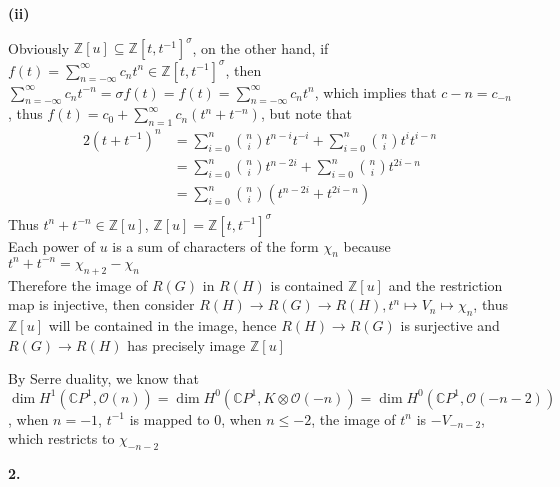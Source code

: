\documentclass[../main.tex]{subfiles}
\begin{document}
\textbf{(ii)} \par
Obviously $\mathbb Z[u]\subseteq\mathbb Z[t,t^{-1}]^\sigma$, on the other hand, if $f(t)=\displaystyle\sum_{n=-\infty}^\infty c_n t^n\in\mathbb Z[t,t^{-1}]^\sigma$, then $\displaystyle\sum_{n=-\infty}^\infty c_n t^{-n}=\sigma f(t)=f(t)=\sum_{n=-\infty}^\infty c_n t^{n}$, which implies that $c-n=c_{-n}$, thus $f(t)=\displaystyle c_0+\sum_{n=1}^\infty c_n(t^n+t^{-n})$, but note that\begin{align*}
2(t+t^{-1})^{n}
&=\displaystyle\sum_{i=0}^n\binom{n}{i}t^{n-i}t^{-i}+\sum_{i=0}^n\binom{n}{i}t^{i}t^{i-n} \\
&=\sum_{i=0}^n\binom{n}{i}t^{n-2i}+\sum_{i=0}^n\binom{n}{i}t^{2i-n} \\
&=\sum_{i=0}^n\binom{n}{i}(t^{n-2i}+t^{2i-n}) \\
\end{align*}
Thus $t^n+t^{-n}\in\mathbb Z[u]$, $\mathbb Z[u]=\mathbb Z[t,t^{-1}]^\sigma$ \\
Each power of $u$ is a sum of characters of the form $\chi_n$ because $t^n+t^{-n}=\chi_{n+2}-\chi_n$ \\
Therefore the image of $R(G)$ in $R(H)$ is contained $\mathbb Z[u]$ and the restriction map is injective, then consider $R(H)\to R(G)\to R(H),t^n\mapsto V_n\mapsto\chi_n$, thus $\mathbb Z[u]$ will be contained in the image, hence $R(H)\to R(G)$ is surjective and $R(G)\to R(H)$ has precisely image $\mathbb Z[u]$ \par
By Serre duality, we know that $\dim H^1(\mathbb CP^1,\mathcal O(n))=\dim H^0(\mathbb CP^1,K\otimes\mathcal O(-n))=\dim H^0(\mathbb CP^1,\mathcal O(-n-2))$, when $n=-1$, $t^{-1}$ is mapped to $0$, when $n\leq-2$, the image of $t^n$ is $-V_{-n-2}$, which restricts to $\chi_{-n-2}$ \par
\textbf{2.} \par
\end{document}
